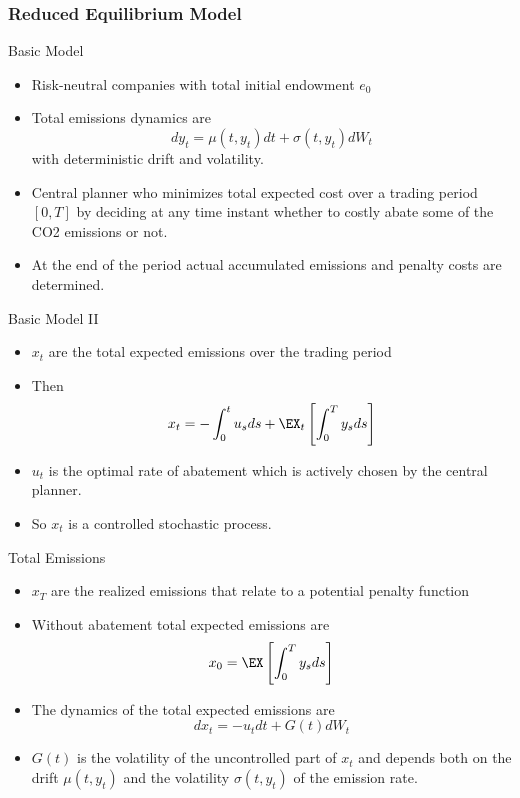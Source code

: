 \subsubsection{Reduced Equilibrium Model}

{Basic Model}
\begin{itemize}
\item<1-> Risk-neutral companies with total initial endowment $e_0$
\item<2-> Total emissions dynamics are
\begin{equation}
dy_t= \mu(t, y_t)dt + \sigma(t, y_t)dW_t
\end{equation}
with deterministic drift and volatility.
\item<3-> Central planner who minimizes total expected cost over a trading period $[0,T]$ by deciding at any time instant
whether to costly abate some of the CO2 emissions or not.
\item<4-> At the end of the period actual accumulated emissions and penalty costs are determined.
\end{itemize}

{Basic Model II}
\begin{itemize}
\item<1-> $x_t$ are the total expected emissions over the trading period
\item<2-> Then
\begin{equation}
x_t=-\int_0^tu_s ds + \EX_t\left[\int_0^T y_s ds \right]
\end{equation}
\item<3-> $u_t$ is the optimal rate of abatement which is  actively chosen by the central planner.
\item<4-> So $x_t$ is a controlled stochastic process.
\end{itemize}

{Total Emissions}
\begin{itemize}
\item<1-> $x_T$ are the realized emissions that relate to a potential penalty function
\item<2-> Without abatement total expected emissions  are
$$
x_0=\EX\left[\int_0^T y_s ds \right]
$$
\item<3-> The dynamics of the total expected emissions are
\begin{equation}
dx_t=-u_t dt + G(t) dW_t
\end{equation}
\item<4-> $G(t)$ is the volatility of the uncontrolled part of $x_t$ and depends both on the drift $\mu(t, y_t)$
and the volatility $\sigma(t,y_t)$ of the emission rate.
\end{itemize}

